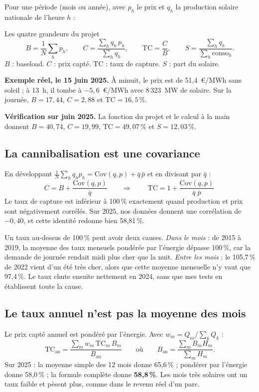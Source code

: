\documentclass[11pt,a4paper]{article}
\newcommand{\TC}{\mathrm{TC}}
\newcommand{\Cov}{\mathrm{Cov}}
\begin{document}
Pour une période (mois ou année), avec $p_h$ le prix et $q_h$ la production solaire nationale de l'heure $h$ :

\begin{definition}{Les quatre grandeurs du projet}
\[
B = \frac{1}{N}\sum_h p_h,
\qquad
C = \frac{\sum_h q_h\,p_h}{\sum_h q_h},
\qquad
\TC = \frac{C}{B},
\qquad
S = \frac{\sum_h q_h}{\sum_h \mathrm{conso}_h}.
\]
$B$ : baseload. $C$ : prix capté. $\TC$ : taux de capture. $S$ : part du solaire.
\end{definition}

\textbf{Exemple réel, le 15 juin 2025.} À minuit, le prix est de 51,4~€/MWh sans soleil ; à 13~h, il tombe à
$-5{,}6$~€/MWh avec 8\,323~MW de solaire. Sur la journée, $B = 17{,}44$, $C = 2{,}88$ et $\TC = 16{,}5\,\%$.

\textbf{Vérification sur juin 2025.} La fonction du projet et le calcul à la main donnent $B = 40{,}74$,
$C = 19{,}99$, $\TC = 49{,}07\,\%$ et $S = 12{,}03\,\%$.

\subsection{La cannibalisation est une covariance}

En développant $\frac1N\sum_h q_h p_h = \Cov(q,p) + \bar q\,\bar p$ et en divisant par $\bar q$ :
\[
C = B + \frac{\Cov(q,p)}{\bar q}
\qquad\Longrightarrow\qquad
\boxed{\ \TC = 1 + \frac{\Cov(q,p)}{\bar q\;\bar p}\ }
\]
Le taux de capture est inférieur à 100\,\% exactement quand production et prix sont négativement corrélés. Sur
2025, nos données donnent une corrélation de $-0{,}40$, et cette identité redonne bien 58,81\,\%.

Un taux au-dessus de 100\,\% peut avoir deux causes. \emph{Dans le mois} : de 2015 à 2019, la moyenne des taux mensuels pondérée par l'énergie dépasse 100\,\%, car la demande de journée rendait midi plus cher que la nuit. \emph{Entre les mois} : le 105,7\,\% de 2022 vient d'un été très cher, alors que cette moyenne mensuelle n'y vaut que 97,4\,\%. Le taux chute ensuite nettement en 2024, sans que mes tests en établissent toute la cause.

\subsection{Le taux annuel n'est pas la moyenne des mois}

Le prix capté annuel est pondéré par l'énergie. Avec $w_m = Q_m / \sum_k Q_k$ :
\[
\TC_{\text{an}} = \frac{\sum_m w_m\,\TC_m\,B_m}{B_{\text{an}}}
\qquad\text{où}\qquad
B_{\text{an}} = \frac{\sum_m B_m H_m}{\sum_m H_m}.
\]
Sur 2025 : la moyenne simple des 12 mois donne 65,6\,\% ; pondérer par l'énergie donne 58,0\,\% ; la formule
complète donne \textbf{58,8\,\%}. Les mois très solaires ont un taux faible et pèsent plus, comme dans le revenu réel d'un parc.
\end{document}
